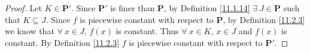 \begin{proof}
    Let \(K \in \mathbf{P}'\).
    Since \(\mathbf{P}'\) is finer than \(\mathbf{P}\), by Definition \ref{11.1.14} \(\exists\ J \in \mathbf{P}\) such that \(K \subseteq J\).
    Since \(f\) is piecewise constant with respect to \(\mathbf{P}\), by Definition \ref{11.2.3} we know that \(\forall\ x \in J\), \(f(x)\) is constant.
    Thus \(\forall\ x \in K\), \(x \in J\) and \(f(x)\) is constant.
    By Definition \ref{11.2.3} \(f\) is piecewise constant with respect to \(\mathbf{P}'\).
\end{proof}